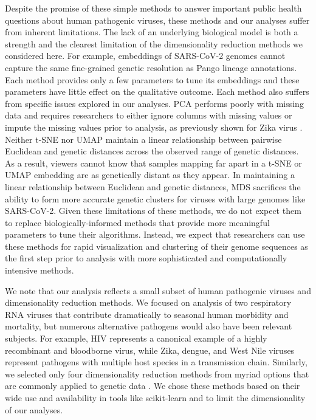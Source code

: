 \documentclass[10pt,letterpaper]{article}
\begin{document}
Despite the promise of these simple methods to answer important public health questions about human pathogenic viruses, these methods and our analyses suffer from inherent limitations.
The lack of an underlying biological model is both a strength and the clearest limitation of the dimensionality reduction methods we considered here.
For example, embeddings of SARS-CoV-2 genomes cannot capture the same fine-grained genetic resolution as Pango lineage annotations.
Each method provides only a few parameters to tune its embeddings and these parameters have little effect on the qualitative outcome.
Each method also suffers from specific issues explored in our analyses.
PCA performs poorly with missing data and requires researchers to either ignore columns with missing values or impute the missing values prior to analysis, as previously shown for Zika virus \cite{metsky_2017}.
Neither t-SNE nor UMAP maintain a linear relationship between pairwise Euclidean and genetic distances across the observed range of genetic distances.
As a result, viewers cannot know that samples mapping far apart in a t-SNE or UMAP embedding are as genetically distant as they appear.
In maintaining a linear relationship between Euclidean and genetic distances, MDS sacrifices the ability to form more accurate genetic clusters for viruses with large genomes like SARS-CoV-2.
Given these limitations of these methods, we do not expect them to replace biologically-informed methods that provide more meaningful parameters to tune their algorithms.
Instead, we expect that researchers can use these methods for rapid visualization and clustering of their genome sequences as the first step prior to analysis with more sophisticated and computationally intensive methods.

We note that our analysis reflects a small subset of human pathogenic viruses and dimensionality reduction methods.
We focused on analysis of two respiratory RNA viruses that contribute dramatically to seasonal human morbidity and mortality, but numerous alternative pathogens would also have been relevant subjects.
For example, HIV represents a canonical example of a highly recombinant and bloodborne virus, while Zika, dengue, and West Nile viruses represent pathogens with multiple host species in a transmission chain.
Similarly, we selected only four dimensionality reduction methods from myriad options that are commonly applied to genetic data \cite{Armstrong2022}.
We chose these methods based on their wide use and availability in tools like scikit-learn \cite{Pedregosa2011} and to limit the dimensionality of our analyses.
\end{document}
